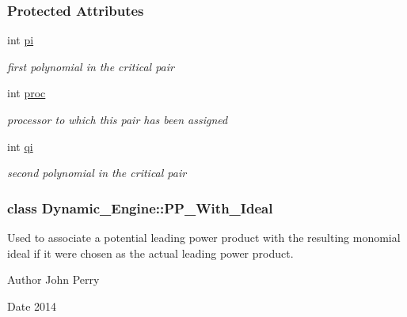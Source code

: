 \subsubsection*{Protected Attributes}
\begin{DoxyCompactItemize}
\item 
\mbox{\label{group___g_b_computation_a815645cd7956540b6980868654e149a3}} 
int \hyperlink{group___g_b_computation_a815645cd7956540b6980868654e149a3}{pi}
\begin{DoxyCompactList}\small\item\em first polynomial in the critical pair \end{DoxyCompactList}\item 
\mbox{\label{group___g_b_computation_a4e0a3c515ad3d9e29cec832d95ab2caa}} 
int \hyperlink{group___g_b_computation_a4e0a3c515ad3d9e29cec832d95ab2caa}{proc}
\begin{DoxyCompactList}\small\item\em processor to which this pair has been assigned \end{DoxyCompactList}\item 
\mbox{\label{group___g_b_computation_a14a644d6decf4147a78dbaa85612130a}} 
int \hyperlink{group___g_b_computation_a14a644d6decf4147a78dbaa85612130a}{qi}
\begin{DoxyCompactList}\small\item\em second polynomial in the critical pair \end{DoxyCompactList}\end{DoxyCompactItemize}
\label{class_dynamic___engine_1_1_p_p___with___ideal}
\subsubsection{class Dynamic\+\_\+\+Engine\+:\+:P\+P\+\_\+\+With\+\_\+\+Ideal}
Used to associate a potential leading power product with the resulting monomial ideal if it were chosen as the actual leading power product. 

\begin{DoxyAuthor}{Author}
John Perry 
\end{DoxyAuthor}
\begin{DoxyDate}{Date}
2014 
\end{DoxyDate}


